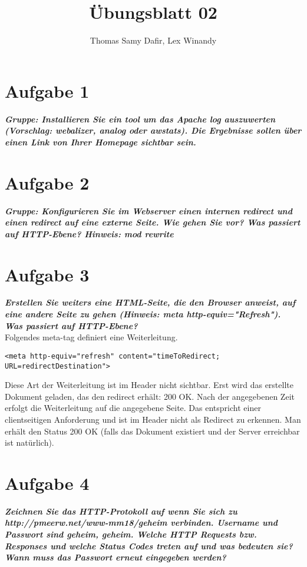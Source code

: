 \documentclass[12pt, a4paper]{report}
\title{Übungsblatt 02}
\author{Thomas Samy Dafir, Lex Winandy}
\date{}
\begin{document}
\maketitle

\section*{Aufgabe 1}
\textbf{\textit{Gruppe: Installieren Sie ein tool um das Apache log auszuwerten (Vorschlag: webalizer, analog oder awstats). Die Ergebnisse sollen über einen Link von Ihrer Homepage sichtbar sein.}}\\

\section*{Aufgabe 2}
\textbf{\textit{Gruppe: Konfigurieren Sie im Webserver einen internen redirect und einen redirect auf eine externe Seite. Wie gehen Sie vor? Was passiert auf HTTP-Ebene? Hinweis: mod rewrite}}\\

\section*{Aufgabe 3}
\textbf{\textit{Erstellen Sie weiters eine HTML-Seite, die den Browser anweist, auf eine andere Seite zu gehen (Hinweis: meta http-equiv="Refresh"). Was passiert auf HTTP-Ebene?}}\\
Folgendes meta-tag definiert eine Weiterleitung.
\begin{verbatim}
<meta http-equiv="refresh" content="timeToRedirect; URL=redirectDestination">
\end{verbatim}
Diese Art der Weiterleitung ist im Header nicht sichtbar. Erst wird das erstellte Dokument geladen, das den redirect erhält: 200 OK. Nach der angegebenen Zeit
erfolgt die Weiterleitung auf die angegebene Seite. Das entspricht einer clientseitigen Anforderung und ist im Header nicht als Redirect zu erkennen. Man erhält
den Status 200 OK (falls das Dokument existiert und der Server erreichbar ist natürlich).


\section*{Aufgabe 4}
\textbf{\textit{Zeichnen Sie das HTTP-Protokoll auf wenn Sie sich zu http://pmeerw.net/www-mm18/geheim verbinden. Username und Passwort sind geheim, geheim. Welche HTTP Requests bzw. Responses und welche Status Codes treten auf und was bedeuten sie? Wann muss das Passwort erneut eingegeben werden?}}\\
\end{document}
